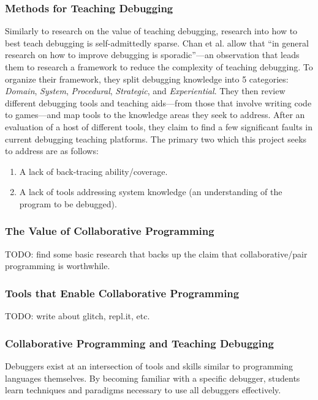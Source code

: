 \documentclass[12pt]{article}
\begin{document}
\subsubsection{Methods for Teaching Debugging}

Similarly to research on the value of teaching debugging, research
into how to best teach debugging is self-admittedly sparse.  Chan et
al. allow that ``in general research on how to improve debugging is
sporadic''---an observation that leads them to research a framework to
reduce the complexity of teaching
debugging\cite{10.1145/3286960.3286970}.  To organize their framework,
they split debugging knowledge into 5 categories: \textit{Domain},
\textit{System}, \textit{Procedural}, \textit{Strategic}, and
\textit{Experiential}.  They then review different debugging tools and
teaching aids---from those that involve writing code to games---and
map tools to the knowledge areas they seek to address.  After an
evaluation of a host of different tools, they claim to find a few
significant faults in current debugging teaching platforms. The
primary two which this project seeks to address are as follows:

\begin{enumerate}
\item A lack of back-tracing ability/coverage.
\item A lack of tools addressing system knowledge (an understanding of
  the program to be debugged).
\end{enumerate}

\subsubsection{The Value of Collaborative Programming}

TODO: find some basic research that backs up the claim that
collaborative/pair programming is worthwhile.

\subsubsection{Tools that Enable Collaborative Programming}

TODO: write about glitch, repl.it, etc.

\subsubsection{Collaborative Programming and Teaching Debugging}

Debuggers exist at an intersection of tools and skills similar to
programming languages themselves. By becoming familiar with a specific
debugger, students learn techniques and paradigms necessary to use all
debuggers effectively.
\pagebreak
\end{document}
